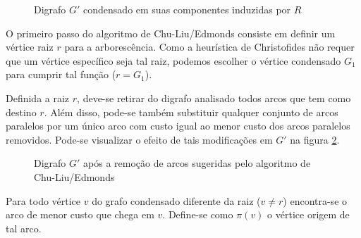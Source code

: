 \begin{enumerate}
\begin{figure}[H]
\begin{tikzpicture}[node distance=3cm, every loop/.style={},thick,main node/.style={circle,draw,font=\sffamily\Large}]
                \end{tikzpicture}
                \caption{Digrafo $G'$ condensado em suas componentes induzidas por $R$}
                \label{condensated-dig}
            \end{figure}

                O primeiro passo do algoritmo de Chu-Liu/Edmonds consiste em definir um vértice raiz $r$ para a arborescência.
                Como a heurística de Christofides não requer que um vértice específico seja tal raiz, podemos escolher o vértice condensado $G_1$ para cumprir tal função ($r = G_1$). 

                Definida a raiz $r$, deve-se retirar do digrafo analisado todos arcos que tem como destino $r$.
                Além disso, pode-se também substituir qualquer conjunto de arcos paralelos por um único arco com custo igual ao menor custo dos arcos paralelos removidos. 
                Pode-se visualizar o efeito de tais modificações em $G'$ na figura \ref{chu-liu}.

            \begin{figure}[H]
                \centering
                \caption{Digrafo $G'$ após a remoção de arcos sugeridas pelo algoritmo de Chu-Liu/Edmonds}
                \label{chu-liu}
            \end{figure}

            Para todo vértice $v$ do grafo condensado diferente da raiz ($v \neq r$) encontra-se o arco de menor custo que chega em $v$.
            Define-se como $\pi(v)$ o vértice origem de tal arco.


\end{enumerate}
